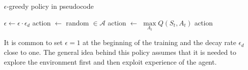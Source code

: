 \begin{algorithm}
\caption{$\epsilon$-greedy policy in pseudocode}
\begin{algorithmic}[1]
\State $\epsilon \gets \epsilon \cdot \epsilon_d$
\State action $\gets$ random $\in \mathcal{A}$
\Else 
\State action $\gets$ $\underset{A_t}{\max} Q(S_t, A_t)$
\EndIf
\State \Return action
\EndFunction
\end{algorithmic}
\end{algorithm}

It is common to set $\epsilon = 1$ at the beginning of the training and the decay rate $\epsilon_d$ close to one. The general idea behind this policy assumes that it is needed to explore the environment first and then exploit experience of the agent.

\clearpage

